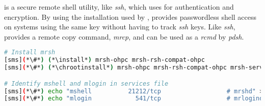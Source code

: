 \mrsh{} is a secure remote shell utility, like {\em ssh}, which uses
\MUNGE{} for authentication and encryption. By using the \MUNGE{}
installation used by \SLURM{}, \mrsh{} provides passwordless shell
access on systems using the same \MUNGE{} key without having to track
{\em ssh} keys. Like {\em ssh}, \mrsh{} provides a remote copy command,
{\em mrcp}, and can be used as a {\em rcmd} by {\em pdsh}.

\begin{lstlisting}[language=bash,keywords={},upquote=true]
# Install mrsh
[sms](*\#*) (*\install*) mrsh-ohpc mrsh-rsh-compat-ohpc
[sms](*\#*) (*\chrootinstall*) mrsh-ohpc mrsh-rsh-compat-ohpc mrsh-server-ohpc

# Identify mshell and mlogin in services file
[sms](*\#*) echo "mshell          21212/tcp                  # mrshd" >> /etc/services
[sms](*\#*) echo "mlogin            541/tcp                  # mrlogind" >> /etc/services
\end{lstlisting}

